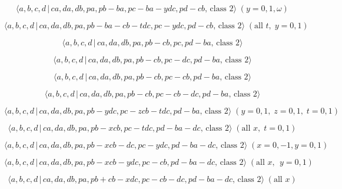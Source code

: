 \documentclass[10pt]{article}
\begin{document}
\begin{equation}
\langle a,b,c,d\,|\,ca,da,db,pa,pb-ba,pc-ba-ydc,pd-cb,\,\text{class }%
2\rangle \;(y=0,1,\omega )  \tag{7.3129}
\end{equation}

\begin{equation}
\langle a,b,c,d\,|\,ca,da,db,pa,pb-ba-cb-tdc,pc-ydc,pd-cb,\,\text{class }%
2\rangle \;(\text{all }t,\;y=0,1)  \tag{7.3130}
\end{equation}

\begin{equation}
\langle a,b,c,d\,|\,ca,da,db,pa,pb-cb,pc,pd-ba,\,\text{class }2\rangle 
\tag{7.3131}
\end{equation}

\begin{equation}
\langle a,b,c,d\,|\,ca,da,db,pa,pb-cb,pc-dc,pd-ba,\,\text{class }2\rangle 
\tag{7.3132}
\end{equation}

\begin{equation}
\langle a,b,c,d\,|\,ca,da,db,pa,pb-cb,pc-cb,pd-ba,\,\text{class }2\rangle 
\tag{7.3133}
\end{equation}

\begin{equation}
\langle a,b,c,d\,|\,ca,da,db,pa,pb-cb,pc-cb-dc,pd-ba,\,\text{class }2\rangle
\tag{7.3134}
\end{equation}

\begin{equation}
\langle a,b,c,d\,|\,ca,da,db,pa,pb-ydc,pc-zcb-tdc,pd-ba,\,\text{class }%
2\rangle \;(y=0,1,\;z=0,1,\;t=0,1)  \tag{7.3135}
\end{equation}

\begin{equation}
\langle a,b,c,d\,|\,ca,da,db,pa,pb-xcb,pc-tdc,pd-ba-dc,\,\text{class }%
2\rangle \;(\text{all }x,\;t=0,1)  \tag{7.3136}
\end{equation}

\begin{equation}
\langle a,b,c,d\,|\,ca,da,db,pa,pb-xcb-dc,pc-ydc,pd-ba-dc,\,\text{class }%
2\rangle \;(x=0,-1, y=0,1)  \tag{7.3137}
\end{equation}

\begin{equation}
\langle a,b,c,d\,|\,ca,da,db,pa,pb-xcb-ydc,pc-cb,pd-ba-dc,\,\text{class }%
2\rangle \;(\text{all }x,\;\,y=0,1)  \tag{7.3138}
\end{equation}

\begin{equation}
\langle a,b,c,d\,|\,ca,da,db,pa,pb+cb-xdc,pc-cb-dc,pd-ba-dc,\,\text{class }%
2\rangle \;(\text{all }x)  \tag{7.3139}
\end{equation}
\end{document}

